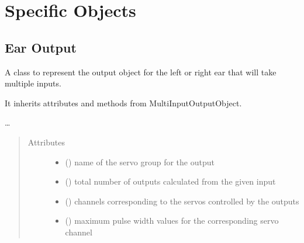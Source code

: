 \documentclass[letterpaper,10pt,english]{sphinxmanual}
\begin{document}
\section{Specific Objects}
\label{\detokenize{specific:specific-objects}}\label{\detokenize{specific::doc}}

\subsection{Ear Output}
\label{\detokenize{specific:module-EarOutput}}\label{\detokenize{specific:ear-output}}

\begin{fulllineitems}
\label{\detokenize{specific:EarOutput.EarOutput}}
\sphinxAtStartPar
A class to represent the output object for the left or right ear that 
will take multiple inputs.

\sphinxAtStartPar
It inherits attributes and methods from MultiInputOutputObject.

\sphinxAtStartPar
…
\begin{quote}\begin{description}
\item[{Attributes}] \leavevmode\begin{itemize}
\item {} 
\sphinxAtStartPar
{}() \textendash{} name of the servo group for the output

\item {} 
\sphinxAtStartPar
{}() \textendash{} total number of outputs 
calculated from the given input

\item {} 
\sphinxAtStartPar
{}(\sphinxstyleemphasis{{[}int{]}}) \textendash{} channels corresponding to 
the servos controlled by the outputs

\item {} 
\sphinxAtStartPar
{}(\sphinxstyleemphasis{{[}int{]}}) \textendash{} maximum pulse width values 
for the corresponding servo channel


\end{itemize}
\end{description}
\end{quote}
\end{fulllineitems}
\end{document}
